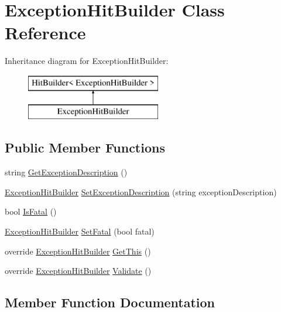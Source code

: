 \hypertarget{class_exception_hit_builder}{}\section{Exception\+Hit\+Builder Class Reference}
\label{class_exception_hit_builder}
Inheritance diagram for Exception\+Hit\+Builder\+:\begin{figure}[H]
\begin{center}
\leavevmode
\includegraphics[height=2.000000cm]{class_exception_hit_builder}
\end{center}
\end{figure}
\subsection*{Public Member Functions}
\begin{DoxyCompactItemize}
\item 
string \hyperlink{class_exception_hit_builder_aba129191ce75546fa011b73ee4e85214}{Get\+Exception\+Description} ()
\item 
\hyperlink{class_exception_hit_builder}{Exception\+Hit\+Builder} \hyperlink{class_exception_hit_builder_a846b1fe7d180d011c0cdca0903342f36}{Set\+Exception\+Description} (string exception\+Description)
\item 
bool \hyperlink{class_exception_hit_builder_a599a1e4792e6b08c0a53a6b6ec9428e0}{Is\+Fatal} ()
\item 
\hyperlink{class_exception_hit_builder}{Exception\+Hit\+Builder} \hyperlink{class_exception_hit_builder_accb6cad07101272600170b3821e4efd4}{Set\+Fatal} (bool fatal)
\item 
override \hyperlink{class_exception_hit_builder}{Exception\+Hit\+Builder} \hyperlink{class_exception_hit_builder_ab26ba8fde304bcae22d2eab95f319677}{Get\+This} ()
\item 
override \hyperlink{class_exception_hit_builder}{Exception\+Hit\+Builder} \hyperlink{class_exception_hit_builder_a92267f29b56b25eecdb6830f3489bace}{Validate} ()
\end{DoxyCompactItemize}


\subsection{Member Function Documentation}
\mbox{\label{class_exception_hit_builder_aba129191ce75546fa011b73ee4e85214}} 
